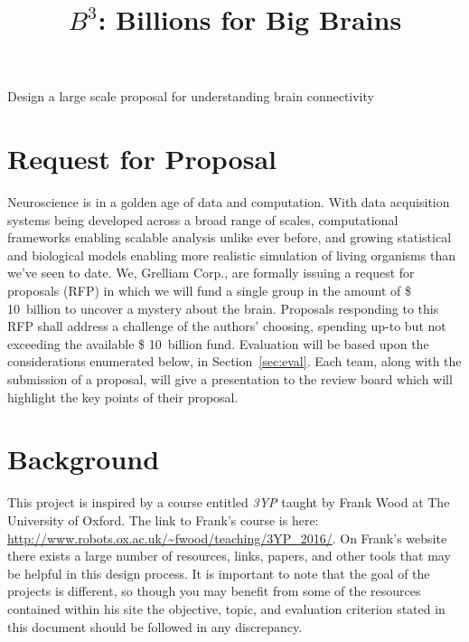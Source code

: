 \documentclass[12pt]{article}
\title{$B^3$: Billions for Big Brains}
\date{}
\begin{document}
\vspace{-0.5cm}
\maketitle
\vspace{-2cm}
\begin{center}
Design a large scale proposal for understanding brain connectivity
\end{center}


\section{Request for Proposal}
Neuroscience is in a golden age of data and computation. With data acquisition systems being developed across
a broad range of scales, computational frameworks enabling scalable analysis unlike ever before, and growing
statistical and biological models enabling more realistic simulation of living organisms than we've seen to date.
We, Grelliam Corp., are formally issuing a request for proposals (RFP) in which we will fund a single group in the
amount of \$ 10~billion to uncover a mystery about the brain. Proposals responding to this RFP shall address a
challenge of the authors' choosing, spending up-to but not exceeding the available \$ 10~billion fund. Evaluation
will be based upon the considerations enumerated below, in Section~\ref{sec:eval}. Each team, along with the
submission of a proposal, will give a presentation to the review board which will highlight the key points of
their proposal.

\section{Background}
This project is inspired by a course entitled \textit{3YP} taught by Frank Wood at The University of Oxford.
The link to Frank's course is here: \url{http://www.robots.ox.ac.uk/~fwood/teaching/3YP_2016/}. On Frank's
website there exists a large number of resources, links, papers, and other tools that may be helpful in this
design process. It is important to note that the goal of the projects is different, so though you may benefit
from some of the resources contained within his site the objective, topic, and evaluation criterion stated
in this document should be followed in any discrepancy.
\end{document}
